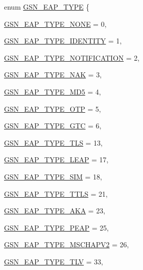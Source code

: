 \begin{DoxyCompactItemize}
enum \hyperlink{a00677_ga95dd88b436cd52a999dda3865de87fe3}{GSN\_\-EAP\_\-TYPE} \{ \par
\hyperlink{a00677_gga95dd88b436cd52a999dda3865de87fe3abe0aad22dfe29df06d642a306ebea61f}{GSN\_\-EAP\_\-TYPE\_\-NONE} =  0, 
\par
\hyperlink{a00677_gga95dd88b436cd52a999dda3865de87fe3a116e2184b38ca7e0eb952b9be5b975ef}{GSN\_\-EAP\_\-TYPE\_\-IDENTITY} =  1, 
\par
\hyperlink{a00677_gga95dd88b436cd52a999dda3865de87fe3a1c5e86e2dd8dc6a75aa824180eb6d81a}{GSN\_\-EAP\_\-TYPE\_\-NOTIFICATION} =  2, 
\par
\hyperlink{a00677_gga95dd88b436cd52a999dda3865de87fe3aa0773e1531c4773594843e21419f2449}{GSN\_\-EAP\_\-TYPE\_\-NAK} =  3, 
\par
\hyperlink{a00677_gga95dd88b436cd52a999dda3865de87fe3a6d97051449aa52519e58503a62a14f81}{GSN\_\-EAP\_\-TYPE\_\-MD5} =  4, 
\par
\hyperlink{a00677_gga95dd88b436cd52a999dda3865de87fe3a89d3a5b0415ab9ee2e618e8b460f0a77}{GSN\_\-EAP\_\-TYPE\_\-OTP} =  5, 
\par
\hyperlink{a00677_gga95dd88b436cd52a999dda3865de87fe3aac896151ff0f797a5945568067ccc447}{GSN\_\-EAP\_\-TYPE\_\-GTC} =  6, 
\par
\hyperlink{a00677_gga95dd88b436cd52a999dda3865de87fe3a98d9efa2ad5fc25861e94d798f8d0c6d}{GSN\_\-EAP\_\-TYPE\_\-TLS} =  13, 
\par
\hyperlink{a00677_gga95dd88b436cd52a999dda3865de87fe3a200b79ff7784577162769d8220d3e8dc}{GSN\_\-EAP\_\-TYPE\_\-LEAP} =  17, 
\par
\hyperlink{a00677_gga95dd88b436cd52a999dda3865de87fe3a8e248c53ed18eda883ff8c941f965dff}{GSN\_\-EAP\_\-TYPE\_\-SIM} =  18, 
\par
\hyperlink{a00677_gga95dd88b436cd52a999dda3865de87fe3ace25bc6165848efaf175e46bc1726545}{GSN\_\-EAP\_\-TYPE\_\-TTLS} =  21, 
\par
\hyperlink{a00677_gga95dd88b436cd52a999dda3865de87fe3a45c1efd67509ef6d8336fe27ac7edad3}{GSN\_\-EAP\_\-TYPE\_\-AKA} =  23, 
\par
\hyperlink{a00677_gga95dd88b436cd52a999dda3865de87fe3a1db5c2e5d5e25299136905db4b3d8d50}{GSN\_\-EAP\_\-TYPE\_\-PEAP} =  25, 
\par
\hyperlink{a00677_gga95dd88b436cd52a999dda3865de87fe3af1cfe046287df0339dfb800b7013f206}{GSN\_\-EAP\_\-TYPE\_\-MSCHAPV2} =  26, 
\par
\hyperlink{a00677_gga95dd88b436cd52a999dda3865de87fe3a391fcb8cd2a4e6472d2de2d093000f0f}{GSN\_\-EAP\_\-TYPE\_\-TLV} =  33, 

\end{DoxyCompactItemize}
